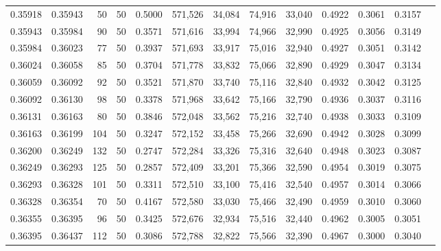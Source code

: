\begin{tabular}{rrrrrrrrrrrrr}
0.35918 & 0.35943 &    50 &  50 &                                     0.5000 & 571,526 &  34,084 &  74,916 &  33,040 & 0.4922 & 0.3061 & 0.3157 \\
0.35943 & 0.35984 &    90 &  50 &                                     0.3571 & 571,616 &  33,994 &  74,966 &  32,990 & 0.4925 & 0.3056 & 0.3149 \\
0.35984 & 0.36023 &    77 &  50 &                                     0.3937 & 571,693 &  33,917 &  75,016 &  32,940 & 0.4927 & 0.3051 & 0.3142 \\
0.36024 & 0.36058 &    85 &  50 &                                     0.3704 & 571,778 &  33,832 &  75,066 &  32,890 & 0.4929 & 0.3047 & 0.3134 \\
0.36059 & 0.36092 &    92 &  50 &                                     0.3521 & 571,870 &  33,740 &  75,116 &  32,840 & 0.4932 & 0.3042 & 0.3125 \\
0.36092 & 0.36130 &    98 &  50 &                                     0.3378 & 571,968 &  33,642 &  75,166 &  32,790 & 0.4936 & 0.3037 & 0.3116 \\
0.36131 & 0.36163 &    80 &  50 &                                     0.3846 & 572,048 &  33,562 &  75,216 &  32,740 & 0.4938 & 0.3033 & 0.3109 \\
0.36163 & 0.36199 &   104 &  50 &                                     0.3247 & 572,152 &  33,458 &  75,266 &  32,690 & 0.4942 & 0.3028 & 0.3099 \\
0.36200 & 0.36249 &   132 &  50 &                                     0.2747 & 572,284 &  33,326 &  75,316 &  32,640 & 0.4948 & 0.3023 & 0.3087 \\
0.36249 & 0.36293 &   125 &  50 &                                     0.2857 & 572,409 &  33,201 &  75,366 &  32,590 & 0.4954 & 0.3019 & 0.3075 \\
0.36293 & 0.36328 &   101 &  50 &                                     0.3311 & 572,510 &  33,100 &  75,416 &  32,540 & 0.4957 & 0.3014 & 0.3066 \\
0.36328 & 0.36354 &    70 &  50 &                                     0.4167 & 572,580 &  33,030 &  75,466 &  32,490 & 0.4959 & 0.3010 & 0.3060 \\
0.36355 & 0.36395 &    96 &  50 &                                     0.3425 & 572,676 &  32,934 &  75,516 &  32,440 & 0.4962 & 0.3005 & 0.3051 \\
0.36395 & 0.36437 &   112 &  50 &                                     0.3086 & 572,788 &  32,822 &  75,566 &  32,390 & 0.4967 & 0.3000 & 0.3040 \\

\end{tabular}
